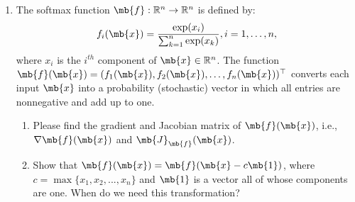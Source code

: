 \begin{exercise}
    \begin{enumerate}
        \item The softmax function $\mb{f}:\mathbb{R}^n\rightarrow\mathbb{R}^n$ is defined by:
            $$f_i(\mb{x})=\frac{\exp(x_i)}{\sum_{k=1}^{n}\exp(x_k)}, i=1,\ldots,n,$$
            where $x_i$ is the $i^{th}$ component of $\mb{x}\in\mathbb{R}^n$. The function  $\mb{f}(\mb{x})=(f_1(\mb{x}),f_2(\mb{x}),\ldots,f_n(\mb{x}))^{\top}$ converts each input $\mb{x}$ into a probability (stochastic) vector in which all entries are nonnegative and add up to one.
            \begin{enumerate}

                \item Please find the gradient and Jacobian matrix of $\mb{f}(\mb{x})$, i.e., $\nabla \mb{f}(\mb{x})$ and $\mb{J}_\mb{f}(\mb{x})$.

                \item Show that $\mb{f}(\mb{x})=\mb{f}(\mb{x}-c\mb{1})$, where $c=\max\{x_1,x_2,...,x_n\}$ and $\mb{1}$ is a vector all of whose components are one. When do we need this transformation?
            \end{enumerate}


\end{enumerate}
\end{exercise}

